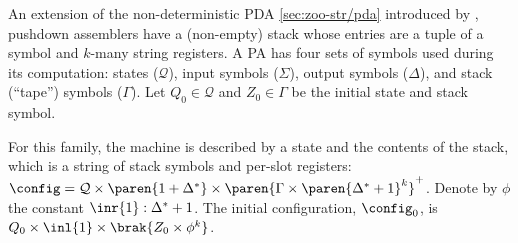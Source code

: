 An extension of the non-deterministic PDA \autoref{sec:zoo-str/pda}
introduced by \cite{aho:pa}, pushdown assemblers have a (non-empty) stack
whose entries are a tuple of a symbol and $k$-many string registers.  A PA
has four sets of symbols used during its computation: states
($\mathcal{Q}$), input symbols ($\Sigma$), output symbols ($\Delta$), and
stack (``tape'') symbols ($\Gamma$).  Let $Q_0 \in \mathcal{Q}$ and $Z_0 \in
\Gamma$ be the initial state and stack symbol.

For this family, the machine is described by a state and the contents of the
stack, which is a string of stack symbols and per-slot registers: $\config =
\mathcal{Q} \times \paren{1 + \Delta^*} \times \paren{ \Gamma \times
\paren{\Delta^* + 1}^k }^+$.  Denote by $\phi$ the constant $\inr{1} :
\Delta^* + 1$.  The initial configuration, $\config_0$, is $Q_0 \times
\inl{1} \times \brak{Z_0 \times \phi^k}$.

